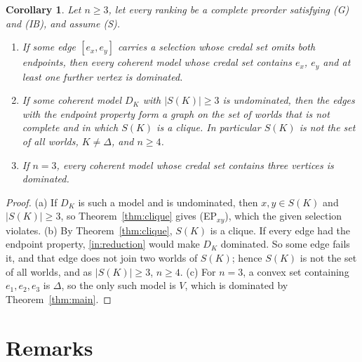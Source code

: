 \documentclass[11pt]{article}
\newtheorem{corollary}[theorem]{Corollary}
\theoremstyle{definition}\newtheorem{definition}[theorem]{Definition}
\theoremstyle{remark}\newtheorem{remark}[theorem]{Remark}
\begin{document}
\begin{corollary}\label{cor:consequences}
Let $n\ge3$, let every ranking be a complete preorder satisfying (G) and
(IB), and assume (S).
\begin{enumerate}[label=(\alph*),leftmargin=*,itemsep=2pt]
\item If some edge $[e_x,e_y]$ carries a selection whose credal set omits
both endpoints, then every coherent model whose credal set contains $e_x$,
$e_y$ and at least one further vertex is dominated.
\item If some coherent model $D_K$ with $|S(K)|\ge3$ is undominated, then
the edges with the endpoint property form a graph on the set of worlds
that is not complete and in which $S(K)$ is a clique. In particular
$S(K)$ is not the set of all worlds, $K\ne\Delta$, and $n\ge4$.
\item If $n=3$, every coherent model whose credal set contains three
vertices is dominated.
\end{enumerate}
\end{corollary}
\begin{proof}
(a) If $D_K$ is such a model and is undominated, then $x,y\in S(K)$ and
$|S(K)|\ge3$, so Theorem~\ref{thm:clique} gives (EP$_{xy}$), which the
given selection violates. (b) By Theorem~\ref{thm:clique}, $S(K)$ is a
clique. If every edge had the endpoint property, \ref{in:reduction} would
make $D_K$ dominated. So some edge fails it, and that edge does not join
two worlds of $S(K)$; hence $S(K)$ is not the set of all worlds, and as
$|S(K)|\ge3$, $n\ge4$. (c) For $n=3$, a convex set containing $e_1,e_2,e_3$
is $\Delta$, so the only such model is $V$, which is dominated by
Theorem~\ref{thm:main}.
\end{proof}

\section{Remarks}\label{sec:remarks}
\end{document}
